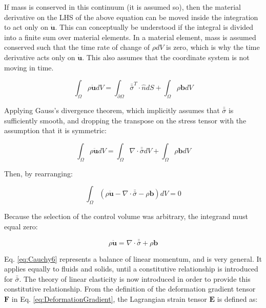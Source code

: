 \documentclass[10pt]{article}
\begin{document}
If mass is conserved in this continuum (it is assumed so), then the material derivative on the LHS of the above equation can be moved inside the integration to act only on \(\dot{\textbf{u}}\). This can conceptually be understood if the integral is divided into a finite sum over material elements. In a material element, mass is assumed conserved such that the time rate of change of \(\rho dV\) is zero, which is why the time derivative acts only on \(\dot{\textbf{u}}\). This also assumes that the coordinate system is not moving in time.

\begin{equation}
\label{eq:Cauchy3}
\int_{\Omega}\rho\ddot{\textbf{u}}dV=\int_{\partial\Omega}\bar{\bar{\sigma}}^T\cdot\hat{n}dS+\int_{\Omega}\rho\textbf{b}dV
\end{equation}

Applying Gauss's divergence theorem, which implicitly assumes that \(\bar{\bar{\sigma}}\) is sufficiently smooth, and dropping the transpose on the stress tensor with the assumption that it is symmetric:

\begin{equation}
\label{eq:Cauchy4}
\int_{\Omega}\rho\ddot{\textbf{u}}dV=\int_{\Omega}\nabla\cdot\bar{\bar{\sigma}}dV+\int_{\Omega}\rho\textbf{b}dV
\end{equation}

Then, by rearranging:

\begin{equation}
\label{eq:Cauchy5}
\int_{\Omega}\left(\rho\ddot{\textbf{u}}-\nabla\cdot\bar{\bar{\sigma}}-\rho\textbf{b}\right)dV=0
\end{equation}

Because the selection of the control volume was arbitrary, the integrand must equal zero:

\begin{equation}
\label{eq:Cauchy6}
\rho\ddot{\textbf{u}}=\nabla\cdot\bar{\bar{\sigma}}+\rho\textbf{b}
\end{equation}

Eq. \eqref{eq:Cauchy6} represents a balance of linear momentum, and is very general. It applies equally to fluids and solids, until a constitutive relationship is introduced for \(\bar{\bar{\sigma}}\). The theory of linear elasticity is now introduced in order to provide this constitutive relationship. From the definition of the deformation gradient tensor \(\textbf{F}\) in Eq. \eqref{eq:DeformationGradient}, the Lagrangian strain tensor \(\textbf{E}\) is defined as:
\end{document}
